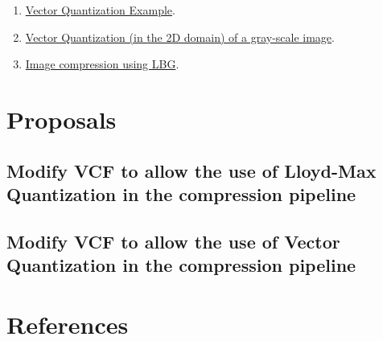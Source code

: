 \begin{enumerate}
\item \href{https://scikit-learn.org/stable/auto_examples/cluster/plot_face_compress.html#sphx-glr-auto-examples-cluster-plot-face-compress-py}{Vector Quantization Example}.
\item
  \href{https://github.com/Sistemas-Multimedia/Sistemas-Multimedia.github.io/blob/master/contents/gray_VQ/gray_VQ.ipynb}{Vector
    Quantization (in the 2D domain) of a gray-scale image}.
\item \href{https://github.com/vicente-gonzalez-ruiz/image_vector_quantization_LBG}{Image compression using LBG}.
\end{enumerate}

\section{Proposals}
\subsection{Modify VCF to allow the use of Lloyd-Max Quantization in the compression pipeline}
\subsection{Modify VCF to allow the use of Vector Quantization in the compression pipeline}

\section{References}

\renewcommand{\addcontentsline}[3]{}%

